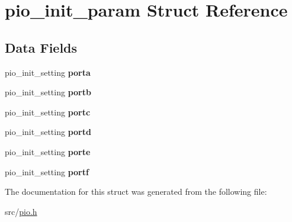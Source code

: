 \hypertarget{structpio__init__param}{\section{pio\+\_\+init\+\_\+param Struct Reference}
\label{structpio__init__param}
}
\subsection*{Data Fields}
\begin{DoxyCompactItemize}
\item 
\hypertarget{structpio__init__param_a8fc36594e9134c559e90d4486cd1da16}{pio\+\_\+init\+\_\+setting {\bfseries porta}}\label{structpio__init__param_a8fc36594e9134c559e90d4486cd1da16}

\item 
\hypertarget{structpio__init__param_a49a5f6eec0de08695cf62efc7c001305}{pio\+\_\+init\+\_\+setting {\bfseries portb}}\label{structpio__init__param_a49a5f6eec0de08695cf62efc7c001305}

\item 
\hypertarget{structpio__init__param_a8115432d36d375c5ee218deae8696f36}{pio\+\_\+init\+\_\+setting {\bfseries portc}}\label{structpio__init__param_a8115432d36d375c5ee218deae8696f36}

\item 
\hypertarget{structpio__init__param_ab1387d999bcdb70ca7ba8859dfb407da}{pio\+\_\+init\+\_\+setting {\bfseries portd}}\label{structpio__init__param_ab1387d999bcdb70ca7ba8859dfb407da}

\item 
\hypertarget{structpio__init__param_ab0658b2fa3a6113aa40629066a456392}{pio\+\_\+init\+\_\+setting {\bfseries porte}}\label{structpio__init__param_ab0658b2fa3a6113aa40629066a456392}

\item 
\hypertarget{structpio__init__param_a118c0722630f431e410a4c9c46d27b15}{pio\+\_\+init\+\_\+setting {\bfseries portf}}\label{structpio__init__param_a118c0722630f431e410a4c9c46d27b15}

\end{DoxyCompactItemize}


The documentation for this struct was generated from the following file\+:\begin{DoxyCompactItemize}
\item 
src/\hyperlink{pio_8h}{pio.\+h}\end{DoxyCompactItemize}
